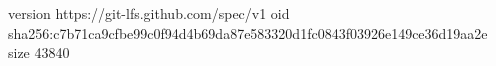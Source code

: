 version https://git-lfs.github.com/spec/v1
oid sha256:c7b71ca9cfbe99c0f94d4b69da87e583320d1fc0843f03926e149ce36d19aa2e
size 43840
